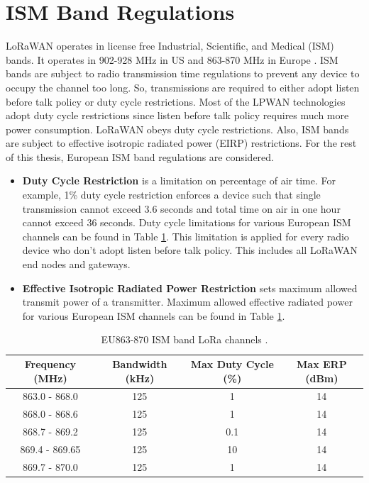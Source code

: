 \section{ISM Band Regulations}
LoRaWAN operates in license free Industrial, Scientific, and Medical (ISM) bands. It operates in 902-928 MHz in US and 863-870 MHz in Europe \cite{lorawan.regional.parameters}. ISM bands are subject to radio transmission time regulations to prevent any device to occupy the channel too long. So, transmissions are required to either adopt listen before talk policy or duty cycle restrictions. Most of the LPWAN technologies adopt duty cycle restrictions since listen before talk policy requires much more power consumption. LoRaWAN obeys duty cycle restrictions. Also, ISM bands are subject to effective isotropic radiated power (EIRP) restrictions. For the rest of this thesis, European ISM band regulations are considered.

\begin{itemize}
  \item \textbf{Duty Cycle Restriction} is a limitation on percentage of air time. For example, 1\% duty cycle restriction enforces a device such that single transmission cannot exceed 3.6 seconds and total time on air in one hour cannot exceed 36 seconds. Duty cycle limitations for various European ISM channels can be found in Table \ref{table:max_tx_power}. This limitation is applied for every radio device who don't adopt listen before talk policy. This includes all LoRaWAN end nodes and gateways.
  \item \textbf{Effective Isotropic Radiated Power Restriction} sets maximum allowed transmit power of a transmitter. Maximum allowed effective radiated power for various European ISM channels can be found in Table \ref{table:max_tx_power}.
\end{itemize}


\begin{table}
\centering
\caption{EU863-870 ISM band LoRa channels \cite{EN300.220} \cite{lorawan.regional.parameters}.}
\label{table:max_tx_power}
\begin{tabular}{|c|c|c|c|}
\hline
\textbf{Frequency (MHz)} & \textbf{Bandwidth (kHz)} & \textbf{Max Duty Cycle (\%)} & \textbf{Max ERP (dBm)} \\ \hline
      863.0 - 868.0  &   125 &   1   &   14 \\ \hline
      868.0 - 868.6  &   125 &   1   &   14 \\ \hline
      868.7 - 869.2  &   125 &   0.1 &   14 \\ \hline
      869.4 - 869.65 &   125 &   10  &   14 \\ \hline
      869.7 - 870.0  &   125 &   1   &   14 \\ \hline
\end{tabular}
\end{table}
